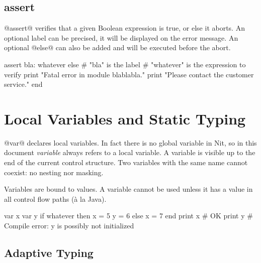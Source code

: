 \subsection{assert}\label{assert}

@assert@ verifies that a given Boolean expression is true, or else it aborts.
An optional label can be precised, it will be displayed on the error message.
An optional @else@ can also be added and will be executed before the abort.
\begin{lst}
assert bla: whatever else
	# "bla" is the label
	# "whatever" is the expression to verify
	print "Fatal error in module blablabla."
	print "Please contact the customer service."
end
\end{lst}

\section{Local Variables and Static Typing}\label{var}\label{static type}

@var@ declares local variables.
In fact there is no global variable in Nit, so in this document \textit{variable} always refers to a local variable.
A variable is visible up to the end of the current control structure.
Two variables with the same name cannot coexist: no nesting nor masking.

Variables are bound to values.
A variable cannot be used unless it has a value in all control flow paths (\`a la Java).

\begin{lst}
var x
var y
if whatever then
	x = 5
	y = 6
else
	x = 7
end
print x # OK
print y # Compile error: y is possibly not initialized
\end{lst}

\subsection{Adaptive Typing}\label{adaptive typing}

